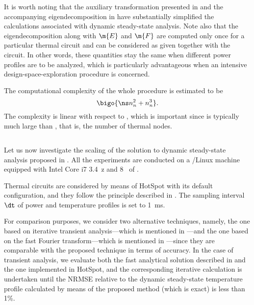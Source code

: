 It is worth noting that the auxiliary transformation presented in
 and the accompanying eigendecomposition in
 have substantially simplified the calculations
associated with dynamic steady-state analysis. Note also that the
eigendecomposition along with $\m{E}$ and $\m{F}$ are computed only once for a
particular thermal  circuit and can be considered as given together with
the circuit. In other words, these quantities stay the same when different power
profiles are to be analyzed, which is particularly advantageous when an
intensive design-space-exploration procedure is concerned.

The computational complexity of the whole procedure is estimated to be
\[
  \bigo{\ns n_n^2 + n_n^3}.
\]
The complexity is linear with respect to \ns, which is important since \ns is
typically much large than \nn, that is, the number of thermal nodes.

\subsection{\resultstitle}

Let us now investigate the scaling of the solution to dynamic steady-state
analysis proposed in . All the experiments
are conducted on a /Linux machine equipped with Intel Core i7
3.4~z and 8~ of .

Thermal  circuits are considered by means of HotSpot \cite{skadron2003}
with its default configuration, and they follow the principle described in
. The sampling interval $\dt$ of power and temperature
profiles is set to 1~ms.

For comparison purposes, we consider two alternative techniques, namely, the one
based on iterative transient analysis---which is mentioned in
---and the one based on the fast Fourier
transform---which is mentioned in ---since
they are comparable with the proposed technique in terms of accuracy. In the
case of transient analysis, we evaluate both the fast analytical solution
described in  and the one implemented in HotSpot,
and the corresponding iterative calculation is undertaken until the \ac{NRMSE}
relative to the dynamic steady-state temperature profile calculated by means of
the proposed method (which is exact) is less than 1\%.

